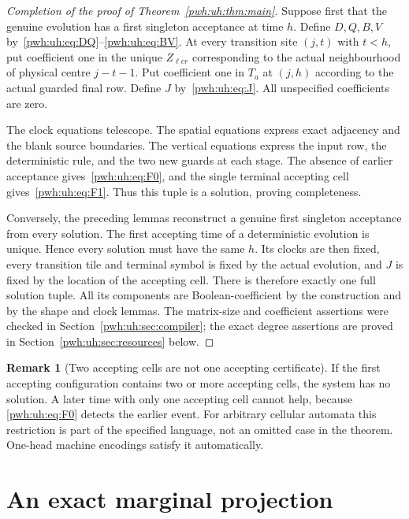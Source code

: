 \documentclass[11pt,letterpaper]{article}
\numberwithin{equation}{section}
\theoremstyle{definition}
\newtheorem{remark}[theorem]{Remark}
\begin{document}
\begin{proof}[Completion of the proof of Theorem~\ref{pwh:uh:thm:main}]
Suppose first that the genuine evolution has a first singleton acceptance
at time $h$. Define $D,Q,B,V$ by~\eqref{pwh:uh:eq:DQ}--\eqref{pwh:uh:eq:BV}. At every
transition site $(j,t)$ with $t<h$, put coefficient one in the unique
$Z_{\ell c r}$ corresponding to the actual neighbourhood of physical
centre $j-t-1$. Put coefficient one in $T_a$ at $(j,h)$ according to the
actual guarded final row. Define $J$ by~\eqref{pwh:uh:eq:J}. All unspecified
coefficients are zero.

The clock equations telescope. The spatial equations express exact
adjacency and the blank source boundaries. The vertical equations express
the input row, the deterministic rule, and the two new guards at each
stage. The absence of earlier acceptance gives~\eqref{pwh:uh:eq:F0}, and the
single terminal accepting cell gives~\eqref{pwh:uh:eq:F1}. Thus this tuple is a
solution, proving completeness.

Conversely, the preceding lemmas reconstruct a genuine first singleton
acceptance from every solution. The first accepting time of a
deterministic evolution is unique. Hence every solution must have the
same $h$. Its clocks are then fixed, every transition tile and terminal
symbol is fixed by the actual evolution, and $J$ is fixed by the location
of the accepting cell. There is therefore exactly one full solution
tuple. All its components are Boolean-coefficient by the construction and
by the shape and clock lemmas. The matrix-size and coefficient assertions
were checked in Section~\ref{pwh:uh:sec:compiler}; the exact degree assertions
are proved in Section~\ref{pwh:uh:sec:resources} below.
\end{proof}

\begin{remark}[Two accepting cells are not one accepting certificate]
If the first accepting configuration contains two or more accepting
cells, the system has no solution. A later time with only one accepting
cell cannot help, because \eqref{pwh:uh:eq:F0} detects the earlier event. For
arbitrary cellular automata this restriction is part of the specified
language, not an omitted case in the theorem. One-head machine encodings
satisfy it automatically.
\end{remark}

\section{An exact marginal projection}
\label{pwh:uh:sec:projection}
\end{document}
